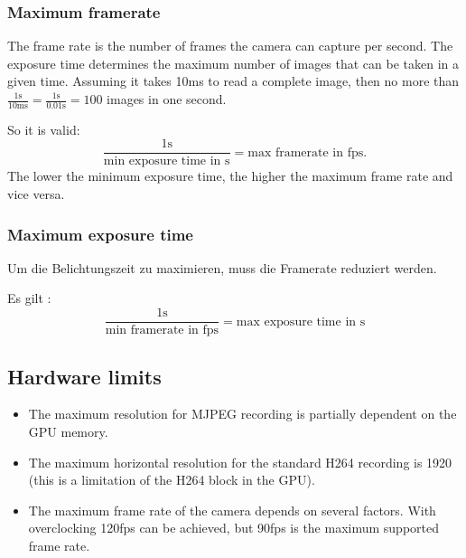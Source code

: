 \documentclass[12pt, a4paper]{report}
\begin{document}
    \subsubsection{Maximum framerate}
    
    The frame rate is the number of frames the camera can capture per second. The exposure time determines the maximum number of images that can be taken in a given time. Assuming it takes 10ms to read a complete image, then no more than $\frac{1 \text{s} }{10 \text{ms}} = \frac{1\text{s}}{0.01\text{s}} = 100 $ images in one second. 
    
    \bigskip
    
    So it is valid: 
    \begin{displaymath}
    \frac{1\text{s}}{\text{min exposure time in s}} = \text{max framerate in
    fps.} 
    \end{displaymath}
    The lower the minimum exposure time, the higher the maximum frame rate and vice versa.
    
    \subsubsection{Maximum exposure time}
    Um die Belichtungszeit zu maximieren, muss die Framerate reduziert werden. 
    
    Es gilt :
    \begin{displaymath}
    \frac{1\text{s}}{\text{min framerate in fps}} = \text{max exposure time
    in s}
    \end{displaymath} 
    
    \subsection{Hardware limits}
    
    \begin{itemize}
    \item The maximum resolution for MJPEG recording is partially dependent on the GPU memory.
    \item The maximum horizontal resolution for the standard H264 recording is 1920 (this is a limitation of the H264 block in the GPU).
    \item The maximum frame rate of the camera depends on several factors. With overclocking 120fps can be achieved, but 90fps is the maximum supported frame rate.
    
    \end{itemize}
    
\end{document}
